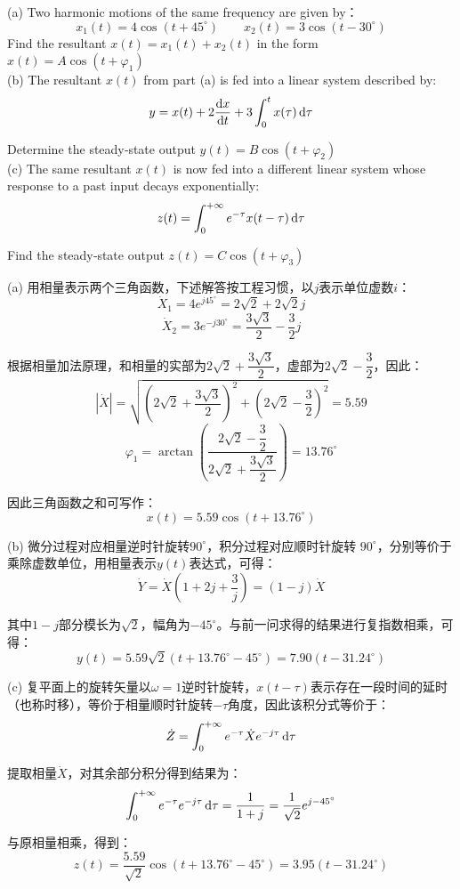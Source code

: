 \begin{solution}
    (a) Two harmonic motions of the same frequency are given by：
    \[x_1(t) = 4\cos(t + 45^\circ)\qquad x_2(t) = 3\cos(t-30^\circ)\]
    Find the resultant $x(t) = x_1(t) + x_2(t)$ in the form $x(t) = A\cos(t + \varphi_1)$\\
    (b) The resultant $x(t)$ from part (a) is fed into a linear system described by:
    \[y = x(t) + 2\dfrac{\dif x}{\dif t} + 3\int_{0}^{t} x(\tau)\dif \tau\]

    Determine the steady‑state output $y(t) = B\cos(t + \varphi_2)$\\
    (c) The same resultant $x(t)$ is now fed into a different linear system whose response to a past input decays exponentially:
    \[z(t) = \int_{0}^{+\infty} e^{-\tau} x(t-\tau)\dif \tau\]

    Find the steady‑state output $z(t) = C\cos(t + \varphi_3)$
    
    \tcbrule
    
    (a) 用相量表示两个三角函数，下述解答按工程习惯，以$j$表示单位虚数$i$：
    \[\dot{X}_1 = 4e^{j 45^\circ} = 2\sqrt{2} + 2\sqrt{2}j\]
    \[\dot{X}_2 = 3e^{-j 30^\circ} = \dfrac{3\sqrt{3}}{2} - \dfrac{3}{2}j\]

    根据相量加法原理，和相量的实部为$2\sqrt{2}+\dfrac{3\sqrt{3}}{2}$，虚部为$2\sqrt{2}-\dfrac{3}{2}$，因此：
    \[\left|\dot{X}\right| = \sqrt{(2\sqrt{2}+\dfrac{3\sqrt{3}}{2})^2 + (2\sqrt{2}-\dfrac{3}{2})^2} = 5.59\]
    \[\varphi_1 = \arctan\left(\dfrac{2\sqrt{2}-\dfrac{3}{2}}{2\sqrt{2}+\dfrac{3\sqrt{3}}{2}}\right) = 13.76^\circ\]

    因此三角函数之和可写作：
    \[x(t) = 5.59\cos(t + 13.76^\circ)\]

    (b) 微分过程对应相量逆时针旋转$90^\circ$，积分过程对应顺时针旋转 $90^\circ$，分别等价于乘除虚数单位，用相量表示$y(t)$表达式，可得：
    \[\dot{Y} = \dot{X}(1 + 2j + \dfrac{3}{j}) = (1-j)\dot{X}\]

    其中$1-j$部分模长为$\sqrt{2}$，幅角为$-45^\circ$。与前一问求得的结果进行复指数相乘，可得：
    \[y(t) = 5.59\sqrt{2}(t + 13.76^\circ - 45^\circ) = 7.90(t - 31.24^\circ)\]

    (c) 复平面上的旋转矢量以$\omega = 1$逆时针旋转，$x(t-\tau)$表示存在一段时间的延时（也称时移），等价于相量顺时针旋转$-\tau$角度，因此该积分式等价于：
    \[\dot{Z} = \int_{0}^{+\infty} e^{-\tau} \dot{X}e^{-j\tau}\dif \tau\]

    提取相量$\dot{X}$，对其余部分积分得到结果为：
    \[\int_{0}^{+\infty} e^{-\tau} e^{-j\tau}\dif \tau = \dfrac{1}{1+j} = \dfrac{1}{\sqrt{2}}e^{j -45^\circ}\]

    与原相量相乘，得到：
    \[z(t) = \dfrac{5.59}{\sqrt{2}}\cos(t + 13.76^\circ - 45^\circ) = 3.95(t - 31.24^\circ)\]
\end{solution}